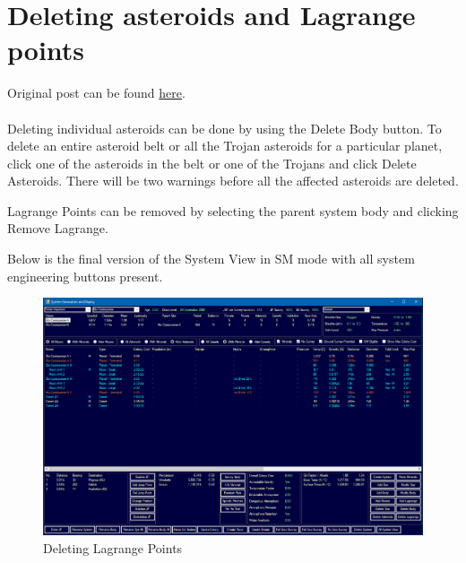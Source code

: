 \documentclass[../../Aurora C# unofficial manual.tex]{subfiles}
\begin{document}
	\section{Deleting asteroids and Lagrange points}\label{7_deleting asteroids_and_lagrange}
	Original post can be found
	\href{http://aurora2.pentarch.org/index.php?topic=8495.msg118803#msg118803}{here}.
	\\\\
	
	Deleting individual asteroids can be done by using the Delete Body button. To delete an entire asteroid belt or all the Trojan asteroids for a particular planet, click one of the asteroids in the belt or one of the Trojans and click Delete Asteroids. There will be two warnings before all the affected asteroids are deleted.
	
	Lagrange Points can be removed by selecting the parent system body and clicking Remove Lagrange.
	
	Below is the final version of the System View in SM mode with all system engineering buttons present.
	\begin{figure}[H]
		\centering
		\includegraphics[width=0.95\linewidth]{images/DeletingLagrangePoints}
		\caption[Deleting Lagrange Points]{Deleting Lagrange Points}
		\label{fig:deletinglagrangepoints}
	\end{figure}	
\end{document}
